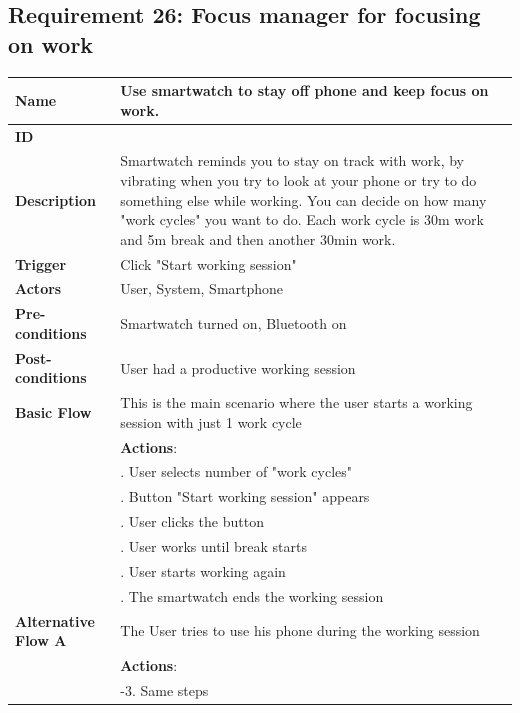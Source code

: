 \documentclass{article}
\begin{document}
	\subsection{Requirement 26: Focus manager for focusing on work}
	\vspace{1em}
	\begin{center}
		\small
		\begin{tabularx}{1.0\textwidth}{|>{\raggedright\arraybackslash}p{}|>{\raggedright\arraybackslash}X|}
			\hline
			\textbf{Name}               & Use smartwatch to stay off phone and keep focus on work. \\\hline
			\textbf{ID}                 & 26 \\\hline
			\textbf{Description}        & Smartwatch reminds you to stay on track with work, by vibrating when you try to look at your phone or try to do something else while working. You can decide on how many "work cycles" you want to do. Each work cycle is 30m work and 5m break and then another 30min work. \\\hline
			\textbf{Trigger}            & Click "Start working session" \\\hline
			\textbf{Actors}             & User, System, Smartphone \\\hline
			\textbf{Pre-conditions}     & Smartwatch turned on, Bluetooth on \\\hline
			\textbf{Post-conditions}    & User had a productive working session \\\hline
			\textbf{Basic Flow} 		& This is the main scenario where the user starts a working session with just 1 work cycle \\\hline
										& \textbf{Actions}: \\
										  & 1. User selects number of "work cycles" \\
										   & 2. Button "Start working session" appears \\
										   & 3. User clicks the button \\
										   & 4. User works until break starts \\
										  & 5. User starts working again \\
										   & 6. The smartwatch ends the working session \\\hline
			\textbf{Alternative Flow A} & The User tries to use his phone during the working session \\\hline
										& \textbf{Actions}: \\
										  & 1-3. Same steps \\

\end{tabularx}
\end{center}
\end{document}
